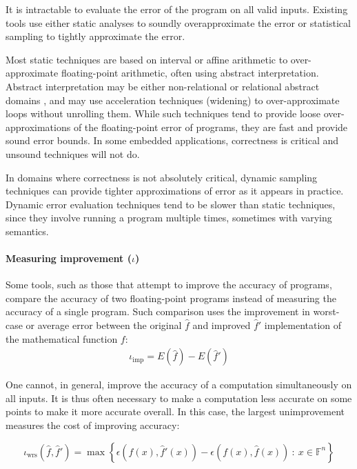 \documentclass[main.tex]{subfiles}
\begin{document}
It is intractable to evaluate the error of the program on all valid inputs.
Existing tools use
  either static analyses to soundly overapproximate the error
  or statistical sampling to tightly approximate the error.

Most static techniques are based on interval or affine arithmetic
  to over-approximate floating-point arithmetic,
  often using abstract interpretation.
Abstract interpretation may be either non-relational \cite{}
  or relational abstract domains \cite{},
  and may use acceleration techniques (widening)
  to over-approximate loops without unrolling them.
While such techniques tend to provide loose over-approximations
of the floating-point error of programs, they are fast and
provide sound error bounds. In some embedded applications,
correctness is critical and unsound techniques will not do.

In domains where correctness is not absolutely critical,
dynamic sampling techniques can provide tighter approximations of
error as it appears in practice. Dynamic error evaluation techniques
tend to be slower than static techniques, since they involve running a
program multiple times, sometimes with varying semantics.

\paragraph{Measuring improvement ($\iota$)}

Some tools,
  such as those that attempt to improve the accuracy of programs,
  compare the accuracy of two floating-point programs
  instead of measuring the accuracy of a single program.
Such comparison uses the improvement in worst-case or average error
  between the original $\hat f$ and improved $\hat f'$ implementation
  of the mathematical function $f$:
\begin{align*}
  \iota_{\text{imp}} = E(\hat{f}) - E(\hat{f}')
\end{align*}

One cannot, in general,
  improve the accuracy of a computation
  simultaneously on all inputs.
It is thus often necessary
  to make a computation less accurate on some points
  to make it more accurate overall.
In this case, the largest unimprovement
  measures the cost of improving accuracy:

\begin{equation*}
  \iota_{\text{wrs}}(\hat{f},\hat{f}') = \max \left\{ \epsilon(f(x),\hat{f}'(x)) - \epsilon(f(x),\hat{f}(x))   
\ :\ x\in \mathbb{F}^n\right\}  
\end{equation*}
\end{document}
